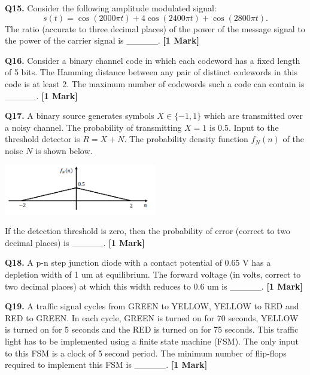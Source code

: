 \documentclass[11pt]{article}
\newcommand{\questiona}[2]{
    \noindent\textbf{Q#2.} #1 \hfill \textbf{[1 Mark]}
}
\begin{document}
\questiona{Consider the following amplitude modulated signal:
\[s(t) = \cos(2000 \pi t) + 4 \cos(2400 \pi t) + \cos(2800 \pi t).\]
The ratio (accurate to three decimal places) of the power of the message signal to the power of the carrier signal is \_\_\_\_\_.}{15}

\vspace{0.5cm}

\questiona{Consider a binary channel code in which each codeword has a fixed length of 5 bits. The Hamming distance between any pair of distinct codewords in this code is at least 2. The maximum number of codewords such a code can contain is \_\_\_\_\_.}{16}

\vspace{0.5cm}

\questiona{A binary source generates symbols $X \in \{-1, 1\}$ which are transmitted over a noisy channel. The probability of transmitting $X = 1$ is 0.5. Input to the threshold detector is $R = X + N$. The probability density function $f_N(n)$ of the noise $N$ is shown below.

\begin{center}
\includegraphics[width=0.5\textwidth]{figures/17.png}
\end{center}

If the detection threshold is zero, then the probability of error (correct to two decimal places) is \_\_\_\_\_.}{17}

\vspace{0.5cm}

\questiona{A p-n step junction diode with a contact potential of 0.65 V has a depletion width of 1 um at equilibrium. The forward voltage (in volts, correct to two decimal places) at which this width reduces to 0.6 um is \_\_\_\_\_.}{18}

\vspace{0.5cm}

\questiona{A traffic signal cycles from GREEN to YELLOW, YELLOW to RED and RED to GREEN. In each cycle, GREEN is turned on for 70 seconds, YELLOW is turned on for 5 seconds and the RED is turned on for 75 seconds. This traffic light has to be implemented using a finite state machine (FSM). The only input to this FSM is a clock of 5 second period. The minimum number of flip-flops required to implement this FSM is \_\_\_\_\_.}{19}
\end{document}
